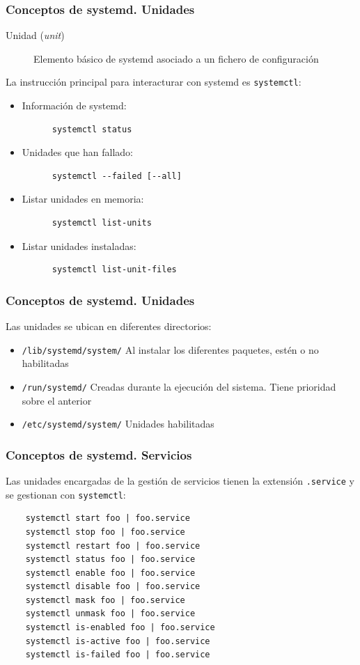 \documentclass[aspectratio=169]{beamer}
\begin{document}
\begin{frame}[fragile]
  \frametitle{Conceptos de systemd. Unidades}
  \begin{description}
  \item[Unidad (\textit{unit})] Elemento básico de systemd asociado a un fichero de configuración
  \end{description}
  La instrucción principal para interacturar con systemd es \texttt{systemctl}:
  \begin{itemize}
  \item Información de systemd:
    \begin{lstlisting}
      systemctl status
    \end{lstlisting}
  \item Unidades que han fallado:
    \begin{lstlisting}
      systemctl --failed [--all]
    \end{lstlisting}
  \item Listar unidades en memoria:
    \begin{lstlisting}
      systemctl list-units
    \end{lstlisting}
  \item Listar unidades instaladas:
    \begin{lstlisting}
      systemctl list-unit-files
    \end{lstlisting}
  \end{itemize}
\end{frame}
  
\begin{frame}
  \frametitle{Conceptos de systemd. Unidades}
  Las unidades se ubican en diferentes directorios:
  \begin{itemize}
  \item \texttt{/lib/systemd/system/} Al instalar los diferentes paquetes, estén o no habilitadas
  \item \texttt{/run/systemd/} Creadas durante la ejecución del sistema. Tiene prioridad sobre el anterior
  \item \texttt{/etc/systemd/system/} Unidades habilitadas
  \end{itemize}
\end{frame}

\begin{frame}[fragile]
  \frametitle{Conceptos de systemd. Servicios}
  Las unidades encargadas de la gestión de servicios tienen la extensión \texttt{.service} y se gestionan con \texttt{systemctl}:
  \begin{lstlisting}
    systemctl start foo | foo.service 
    systemctl stop foo | foo.service 
    systemctl restart foo | foo.service 
    systemctl status foo | foo.service 
    systemctl enable foo | foo.service 
    systemctl disable foo | foo.service 
    systemctl mask foo | foo.service 
    systemctl unmask foo | foo.service 
    systemctl is-enabled foo | foo.service
    systemctl is-active foo | foo.service
    systemctl is-failed foo | foo.service
  \end{lstlisting}
\end{frame}
\end{document}
